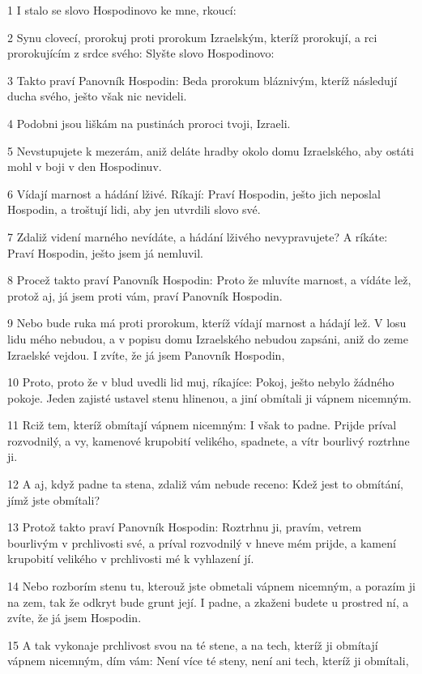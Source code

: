 \par 1 I stalo se slovo Hospodinovo ke mne, rkoucí:
\par 2 Synu clovecí, prorokuj proti prorokum Izraelským, kteríž prorokují, a rci prorokujícím z srdce svého: Slyšte slovo Hospodinovo:
\par 3 Takto praví Panovník Hospodin: Beda prorokum bláznivým, kteríž následují ducha svého, ješto však nic nevideli.
\par 4 Podobni jsou liškám na pustinách proroci tvoji, Izraeli.
\par 5 Nevstupujete k mezerám, aniž deláte hradby okolo domu Izraelského, aby ostáti mohl v boji v den Hospodinuv.
\par 6 Vídají marnost a hádání lživé. Ríkají: Praví Hospodin, ješto jich neposlal Hospodin, a troštují lidi, aby jen utvrdili slovo své.
\par 7 Zdaliž videní marného nevídáte, a hádání lživého nevypravujete? A ríkáte: Praví Hospodin, ješto jsem já nemluvil.
\par 8 Procež takto praví Panovník Hospodin: Proto že mluvíte marnost, a vídáte lež, protož aj, já jsem proti vám, praví Panovník Hospodin.
\par 9 Nebo bude ruka má proti prorokum, kteríž vídají marnost a hádají lež. V losu lidu mého nebudou, a v popisu domu Izraelského nebudou zapsáni, aniž do zeme Izraelské vejdou. I zvíte, že já jsem Panovník Hospodin,
\par 10 Proto, proto že v blud uvedli lid muj, ríkajíce: Pokoj, ješto nebylo žádného pokoje. Jeden zajisté ustavel stenu hlinenou, a jiní obmítali ji vápnem nicemným.
\par 11 Rciž tem, kteríž obmítají vápnem nicemným: I však to padne. Prijde príval rozvodnilý, a vy, kamenové krupobití velikého, spadnete, a vítr bourlivý roztrhne ji.
\par 12 A aj, když padne ta stena, zdaliž vám nebude receno: Kdež jest to obmítání, jímž jste obmítali?
\par 13 Protož takto praví Panovník Hospodin: Roztrhnu ji, pravím, vetrem bourlivým v prchlivosti své, a príval rozvodnilý v hneve mém prijde, a kamení krupobití velikého v prchlivosti mé k vyhlazení jí.
\par 14 Nebo rozborím stenu tu, kterouž jste obmetali vápnem nicemným, a porazím ji na zem, tak že odkryt bude grunt její. I padne, a zkaženi budete u prostred ní, a zvíte, že já jsem Hospodin.
\par 15 A tak vykonaje prchlivost svou na té stene, a na tech, kteríž ji obmítají vápnem nicemným, dím vám: Není více té steny, není ani tech, kteríž ji obmítali,
